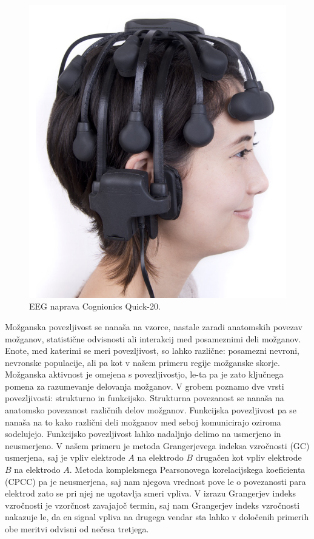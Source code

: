 \begin{figure}[h!]
    \begin{center}
    \includegraphics[width=0.5\linewidth]{slike/Cognionics Quick-20.png}
    \end{center}
    \caption[EEG naprava Cognionics Quick-20.]{EEG naprava Cognionics Quick-20. \cite{CognionicsQUICK20User}}
    \label{slika:quick_20}
    \end{figure}
Možganska povezljivost se nanaša na vzorce, nastale zaradi anatomskih povezav možganov, statistične odvisnosti ali interakcij med posameznimi deli možganov. Enote, med katerimi se meri povezljivost, so lahko različne: posamezni nevroni, nevronske populacije, ali pa kot v našem primeru regije možganske skorje. Možganska aktivnost je omejena s povezljivostjo, le-ta pa je zato ključnega pomena za razumevanje delovanja možganov. V grobem poznamo dve vrsti povezljivosti: strukturno in funkcijsko. Strukturna povezanost se nanaša na anatomsko povezanost različnih delov možganov. Funkcijska povezljivost pa se nanaša na to kako različni deli možganov med seboj komunicirajo oziroma sodelujejo.\cite{spornsBrainConnectivity2007} Funkcijsko povezljivost lahko nadaljnjo delimo na usmerjeno in neusmerjeno. V našem primeru je metoda Grangerjevega indeksa vzročnosti (GC) usmerjena, saj je vpliv elektrode $A$ na elektrodo $B$ drugačen kot vpliv elektrode $B$ na elektrodo $A$. Metoda kompleksnega Pearsonovega korelacijskega koeficienta (CPCC) pa je neusmerjena, saj nam njegova vrednost pove le o povezanosti para elektrod zato se pri njej ne ugotavlja smeri vpliva.
V izrazu Grangerjev indeks vzročnosti je vzorčnost zavajajoč termin, saj nam Grangerjev indeks vzročnosti nakazuje le, da en signal vpliva na drugega vendar sta lahko v določenih primerih obe meritvi odvisni od nečesa tretjega.

